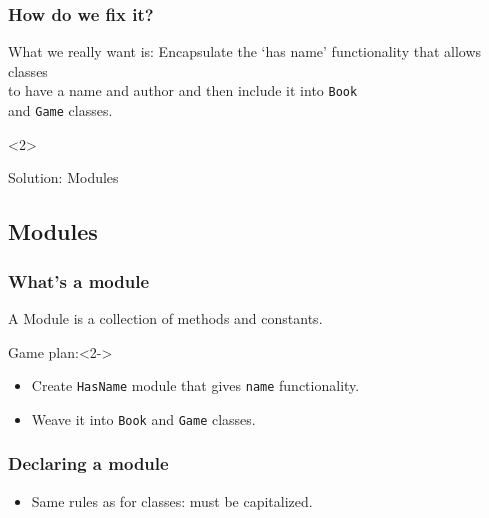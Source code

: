 \documentclass{beamer}
\begin{document}
\begin{frame}[t]
  \frametitle{How do we fix it?}
  \begin{block}{What we really want is:}
    Encapsulate the `has name' functionality that allows classes \\ 
    to have a name and author and then include it into \texttt{Book} \\ 
    and \texttt{Game} classes.
  \end{block}
  \begin{onlyenv}<2>
    \begin{block}{Solution:}
      Modules
    \end{block}
  \end{onlyenv}
\end{frame}

\subsection{Modules}

\begin{frame}
  \frametitle{What's a module}
  \begin{definition}[Module]
    A Module is a collection of methods and constants.
  \end{definition}

  \begin{block}{Game plan:}<2->
    \begin{itemize}
      \item<2> Create \texttt{HasName} module that gives \texttt{name} functionality.
      \item<3> Weave it into \texttt{Book} and \texttt{Game} classes.
    \end{itemize}
  \end{block}
\end{frame}

\begin{frame}[t,fragile]
  \frametitle{Declaring a module}
  \begin{semiverbatim}
  \end{semiverbatim}

  \begin{itemize}
    \item<2> Same rules as for classes: must be capitalized.
  \end{itemize}
\end{frame}
\end{document}
